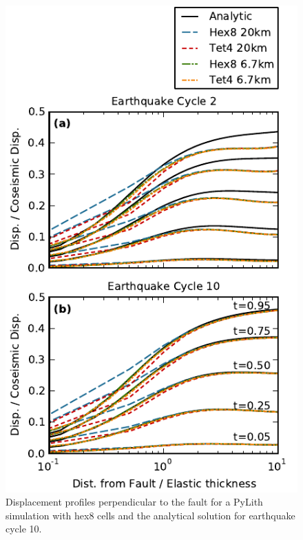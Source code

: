 \begin{figure}[htbp]
  \includegraphics[scale=0.66]{benchmarks/figs/savageprescott_soln_profiles}
  \caption{Displacement profiles perpendicular to the fault for a
    PyLith simulation with hex8 cells and the analytical solution for
    earthquake cycle 10.}
  \label{fig:benchmark:savageprescott:solution}
\end{figure}

